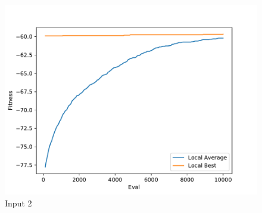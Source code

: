\documentclass{standalone}
\begin{document}
\begin{figure}[!htb]
	\caption{Input 2}
	\label{fig:graph_2013}
	\includegraphics[width=\textwidth]{../graphs/graphs/2013.pdf}
\end{figure}
\end{document}
